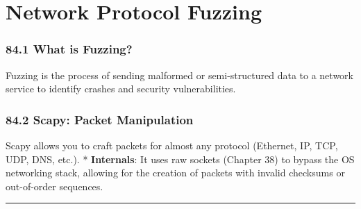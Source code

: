 \hypertarget{network-protocol-fuzzing}{%
\chapter{Network Protocol Fuzzing}\label{network-protocol-fuzzing}}

\hypertarget{what-is-fuzzing}{%
\subsection{84.1 What is Fuzzing?}\label{what-is-fuzzing}}

Fuzzing is the process of sending malformed or semi-structured data to a
network service to identify crashes and security vulnerabilities.

\hypertarget{scapy-packet-manipulation}{%
\subsection{84.2 Scapy: Packet
Manipulation}\label{scapy-packet-manipulation}}

Scapy allows you to craft packets for almost any protocol (Ethernet, IP,
TCP, UDP, DNS, etc.). * \textbf{Internals}: It uses raw sockets (Chapter
38) to bypass the OS networking stack, allowing for the creation of
packets with invalid checksums or out-of-order sequences.

\begin{center}\rule{0.5\linewidth}{0.5pt}\end{center}
